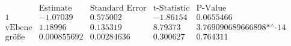 \[\begin{array}{l|llll}
 \text{} & \text{Estimate} & \text{Standard Error} & \text{t-Statistic} & \text{P-Value} \\
\hline
 1 & -1.07039 & 0.575002 & -1.86154 & 0.0655466 \\
 \text{vEbene} & 1.18996 & 0.135319 & 8.79373 & \text{3.769090689666898$\grave{ }$*${}^{\wedge}$-14} \\
 \text{gr{\" o}{\ss}e} & 0.000855692 & 0.00284636 & 0.300627 & 0.764311 \\
\end{array}\]

